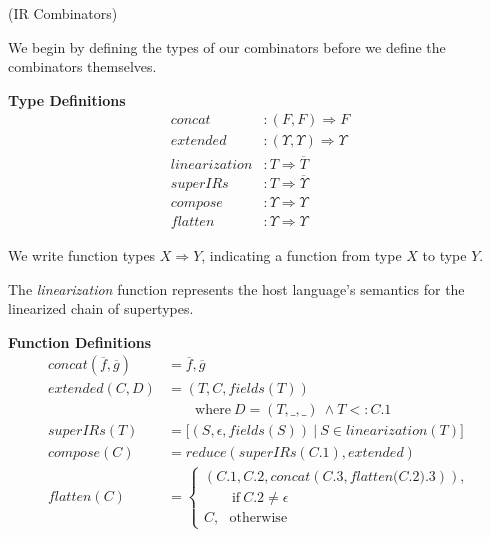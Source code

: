 \documentclass[10pt]{sigplanconf}
\theoremstyle{definition}
\theoremstyle{definition}
\begin{document}
\begin{defn}{(IR Combinators)}

We begin by defining the types of our combinators before we define the
combinators themselves.

\vspace{0.2cm}
{\bf Type Definitions}
{\small
\begin{align*}
\textit{concat}&        : (F, F) \Rightarrow F\\
\textit{extended}&      : (\Upsilon, \Upsilon) \Rightarrow \Upsilon\\
\textit{linearization}& : T \Rightarrow \overline{T}\\
\textit{superIRs}&      : T \Rightarrow \overline{\Upsilon}\\
\textit{compose}&       : \Upsilon \Rightarrow \Upsilon\\
\textit{flatten}&       : \Upsilon \Rightarrow \Upsilon
\end{align*}
}%

We write function types $X \Rightarrow Y$, indicating a function from type $X$
to type $Y$.

The \textit{linearization} function represents the host language's semantics for the
linearized chain of supertypes.\footnotemark[3]

\vspace{1em}

{\bf Function Definitions}
{\small
\begin{align*}
\textit{concat}(\overline{f}, \overline{g})& = \overline{f}, \overline{g}\\
\textit{extended}(C, D)&                     = (T, C, \textit{fields}(T))\\
                       &                       \qquad \mbox{where}~D = (T, \_, \_)~\land T <: C.1\\
\textit{superIRs}(T)&                        = \lbrack(S, \epsilon, \textit{fields}(S))~|~S\in \textit{linearization}(T)\rbrack\\
\textit{compose}(C)&                         = \textit{reduce}(\textit{superIRs}(C.1),\textit{extended})\\
\textit{flatten}(C)&                         =\left\{ \begin{array}{l}
                                                (C.1, C.2, \textit{concat}(C.3, \textit{flatten(C.2).3})),\\
                                                \qquad\mbox{if}~C.2\neq\epsilon\\
                                                C,~~~\mbox{otherwise}
                                              \end{array} \right.
\end{align*}
}%



\end{defn}
\end{document}
